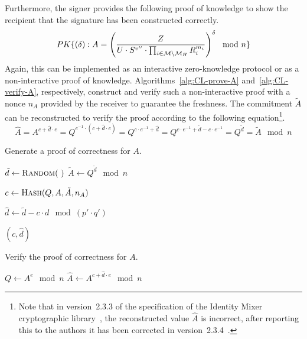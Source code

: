 Furthermore, the signer provides the following proof of knowledge to show the
recipient that the signature has been constructed correctly.
\begin{equation*}
  PK\{(\delta) : A = \left(\dfrac{Z}{U \cdot S^{v''} \cdot
    \prod_{i \in \mathcal{M} \setminus \mathcal{M}_H} R_i^{m_i}} \right)^{\delta} \mod n \}
\end{equation*}
Again, this can be implemented as an interactive zero-knowledge protocol or as
a non-interactive proof of knowledge. Algorithms~\ref{alg:CL-prove-A}
and~\ref{alg:CL-verify-A}, respectively, construct and verify such a
non-interactive proof with a nonce $n_A$ provided by the receiver to guarantee the freshness. The
commitment $\tilde{A}$ can be reconstructed to verify the proof according to
the following equation\footnote{Note that in version~2.3.3 of the specification
of the Identity Mixer cryptographic library~\cite{IdemixCrypto2011}, the
reconstructed value $\hat{A}$ is incorrect, after reporting this to the authors
it has been corrected in version~2.3.4~\cite{IdemixCrypto2012}.}.
\begin{equation*}
  \hat{A}
   = A^{c + \hat{d} \cdot e}
   = Q^{e^{-1} \cdot (c + \hat{d} \cdot e)}
   = Q^{c \cdot e^{-1} + \hat{d}}
   = Q^{c \cdot e^{-1} + \tilde{d} - c \cdot e^{-1}}
   = Q^{\tilde{d}}
   = \tilde{A} \mod n
\end{equation*}

\begin{algorithm}
  \caption{Generate a proof of correctness for $A$.}
  \label{alg:CL-prove-A}
  \addtolength{\baselineskip}{1mm}
  \begin{algorithmic}[1]
      \State $\tilde{d} \gets \Call{Random}{~}$
      \State $\tilde{A} \gets Q^{\tilde{d}} \mod n$

      \State $c \gets \Call{Hash}{Q, A, \tilde{A}, n_A}$

      \State $\hat{d} \gets \tilde{d} - c \cdot d \mod (p' \cdot q')$

      \Return $(c, \hat{d})$
    \EndFunction
  \end{algorithmic}
\end{algorithm}

\begin{algorithm}
  \caption{Verify the proof of correctness for $A$.}
  \label{alg:CL-verify-A}
  \addtolength{\baselineskip}{1mm}
  \begin{algorithmic}[1]
      \State $Q \gets A^e \mod n$
      \State $\hat{A} \gets A^{c + \hat{d} \cdot e} \mod n$

        \Return {}
      \EndIf

      \Return {}
    \EndFunction
  \end{algorithmic}
\end{algorithm}

